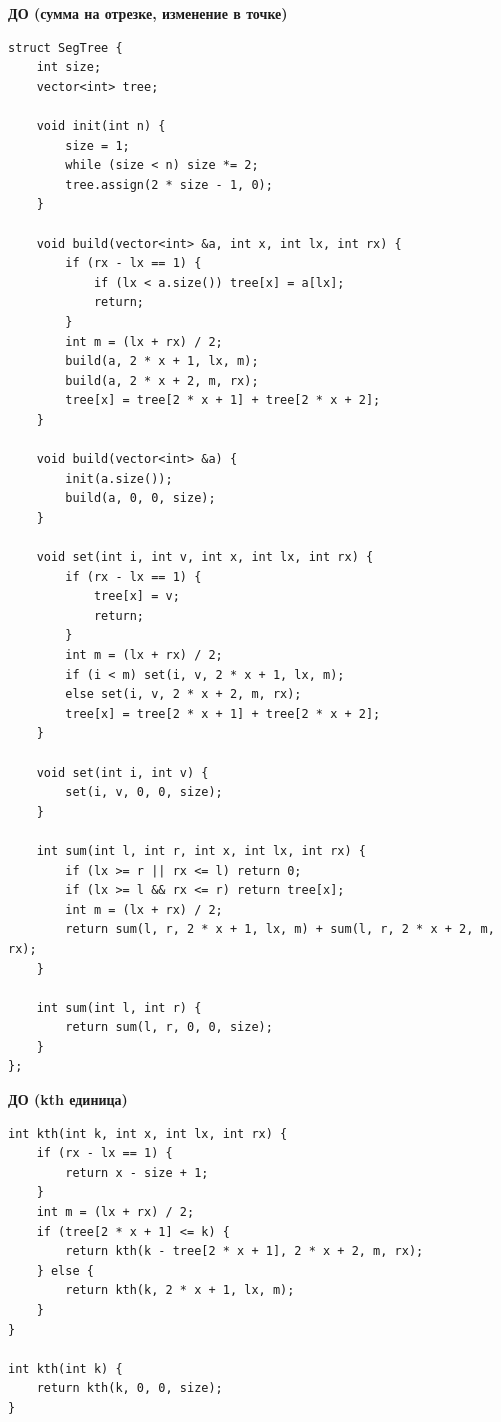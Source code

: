 \documentclass[a4paper, 10pt]{article}
\begin{document}
{\Large \textbf{ДО (сумма на отрезке, изменение в точке)}}
\begin{lstlisting}
struct SegTree {
    int size;
    vector<int> tree;

    void init(int n) {
        size = 1;
        while (size < n) size *= 2;
        tree.assign(2 * size - 1, 0);
    }

    void build(vector<int> &a, int x, int lx, int rx) {
        if (rx - lx == 1) {
            if (lx < a.size()) tree[x] = a[lx];
            return;
        }
        int m = (lx + rx) / 2;
        build(a, 2 * x + 1, lx, m);
        build(a, 2 * x + 2, m, rx);
        tree[x] = tree[2 * x + 1] + tree[2 * x + 2];
    }

    void build(vector<int> &a) {
        init(a.size());
        build(a, 0, 0, size);
    }

    void set(int i, int v, int x, int lx, int rx) {
        if (rx - lx == 1) {
            tree[x] = v;
            return;
        }
        int m = (lx + rx) / 2;
        if (i < m) set(i, v, 2 * x + 1, lx, m);
        else set(i, v, 2 * x + 2, m, rx);
        tree[x] = tree[2 * x + 1] + tree[2 * x + 2];
    }

    void set(int i, int v) {
        set(i, v, 0, 0, size);
    }

    int sum(int l, int r, int x, int lx, int rx) {
        if (lx >= r || rx <= l) return 0;
        if (lx >= l && rx <= r) return tree[x];
        int m = (lx + rx) / 2;
        return sum(l, r, 2 * x + 1, lx, m) + sum(l, r, 2 * x + 2, m, rx);
    }

    int sum(int l, int r) {
        return sum(l, r, 0, 0, size);
    }
};
\end{lstlisting}

{\Large \textbf{ДО (kth единица)}}
\begin{lstlisting}
int kth(int k, int x, int lx, int rx) {
	if (rx - lx == 1) {
		return x - size + 1;
	}
	int m = (lx + rx) / 2;
	if (tree[2 * x + 1] <= k) {
		return kth(k - tree[2 * x + 1], 2 * x + 2, m, rx);
	} else {
		return kth(k, 2 * x + 1, lx, m);
	}
}

int kth(int k) {
	return kth(k, 0, 0, size);
}
\end{lstlisting}
\end{document}
